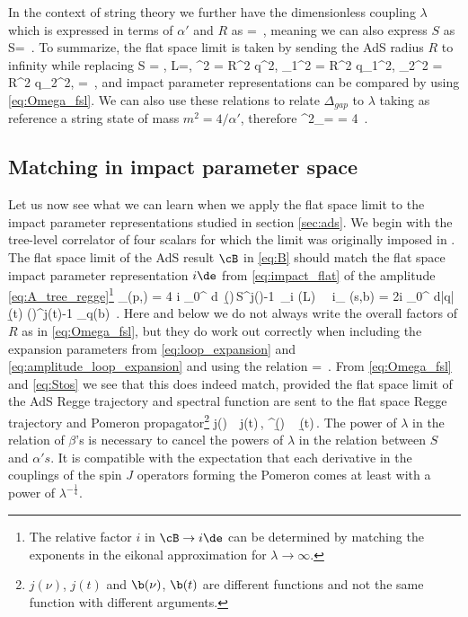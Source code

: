 In the context of string theory we further have the dimensionless coupling $\lambda$ which is expressed in terms of $\alpha'$ and $R$ as
\beq
\sqrt{\l} = \,,
\eeq
meaning we can also express $S$ as
\beq
S= \,.
\label{eq:Stos}
\eeq
To summarize, the flat space limit is taken by
sending the AdS radius $R$ to infinity while replacing
\beq
S = , \quad L=, \quad	\nu^2 = R^2 q^2, \quad \nu_1^2 = R^2 q_1^2, \quad  \nu_2^2 = R^2 q_2^2, \quad \sqrt{\l} =   \,,
\label{eq:flat_space_limit}
\eeq
and impact parameter representations can be compared by using \eqref{eq:Omega_fsl}.
We can also use these relations to relate $\Delta_{gap}$ to $\lambda$ taking as reference a string state of mass $m^2=4/\alpha'$, therefore
\beq
\Delta^2_{}= = 4 \sqrt{\lambda}\,.
\eeq

\subsection{Matching in impact parameter space}
\label{sec:matching_impact_parameter}
Let us now see what we can learn when we apply the flat space limit to the impact parameter representations studied in section \ref{sec:ads}. We begin with the tree-level correlator of four scalars for which the limit was originally imposed in \cite{Cornalba:2007fs}.
The flat space limit of the AdS result $\cB$ in \eqref{eq:B} should match the flat space impact parameter representation $i \de$ from \eqref{eq:impact_flat} of the amplitude \eqref{eq:A_tree_regge}\footnote{The relative factor $i$ in $\cB \to i \de$ can be determined by matching the exponents in the eikonal approximation for $\lambda \to \infty$.}
\beq
\cB_{}(p,\pb) = 4 \pi i \int\limits_{0}^{\oo} d\nu \, \b(\nu)\,S^{j(\nu)-1}\, \Omega_{i\nu} (L)
\ \to \
i\de_{} (s,b) = 2i \int\limits_0^{\oo} d|q|\, \b(t) \left(\right)^{j(t)-1} \omega_q(b) \,.
\label{eq:flat_space_limit_dilatons}
\eeq
Here and below we do not always write the overall factors of $R$ as in \eqref{eq:Omega_fsl}, but they do work out correctly when including the expansion parameters from
\eqref{eq:loop_expansion} and \eqref{eq:amplitude_loop_expansion} and using the relation
\beq
{} =  \,.
\eeq
From \eqref{eq:Omega_fsl} and \eqref{eq:Stos} we see that
this does indeed match, provided  the flat space limit of the AdS Regge trajectory and spectral function are sent to the flat space Regge trajectory and Pomeron propagator\footnote{$j(\nu)$, $j(t)$ and $\b(\nu)$, $\b(t)$ are different functions and not the same function with different arguments.}
\beq
j(\nu)\, \to\,  j(t)\,, \qquad \lambda^{}\b(\nu)\, \to\,   \,\b(t)\,.
\label{eq:lim_beta}
\eeq
The power of $\lambda$ in the relation of $\beta$'s is necessary to cancel the powers of $\lambda$ in the relation between $S$ and $\alpha' s$.
It is compatible with the expectation that each derivative in the couplings of the spin $J$ operators forming the Pomeron comes at least with a power of $\lambda^{-\frac{1}{4}}$.

